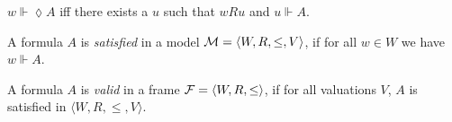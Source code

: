 \documentclass[twoside]{aiml18}
\begin{document}
$w \Vdash \lozenge A$ iff there exists a $u$ such that $wRu$ and $u \Vdash A$.





\begin{definition}
	A formula $A$ is \emph{satisfied} in a model $\mathcal{M} = \langle W, R, \le, V \rangle$, if for all $w \in W$ we have $w \Vdash A$.
\end{definition}

\begin{definition}
	A formula $A$ is \emph{valid} in a frame $\mathcal{F} = \langle W, R, \le \rangle$, if for all valuations $V$, $A$ is satisfied in $\langle W, R, \le, V \rangle$.
\end{definition}
\end{document}

